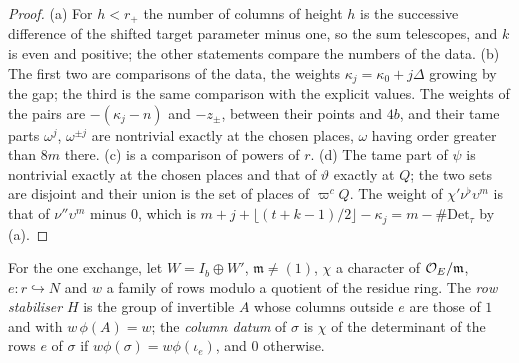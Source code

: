 \begin{proof}
(a) For $h<r_+$ the number of columns of height $h$ is the successive difference of the shifted target parameter minus one, so the sum telescopes, and $k$ is even and positive; the other statements compare the numbers of
the data. (b) The first two are comparisons of the data, the weights $\kappa_j=\kappa_0+j\Delta$ growing by the gap; the third is the same comparison with the explicit values. The weights of the pairs are $-(\kappa_j-n)$ and $-z_\pm$,
between their points and $4b$, and their tame parts $\omega^j$, $\omega^{\pm j}$ are nontrivial exactly at the chosen places, $\omega$ having order greater than $8m$ there. (c) is a comparison of powers of $r$. (d) The tame part of $\psi$ is
nontrivial exactly at the chosen places and that of $\vartheta$ exactly at $Q$; the two sets are disjoint and their union is the set of places of $\varpi^cQ$. The weight of $\chi'\nu^\flat\upsilon^m$ is that of $\nu''\upsilon^m$ minus $0$, which is
$m+j+\lfloor(t+k-1)/2\rfloor-\kappa_j=m-\#\mathrm{Det}_\tau$ by (a).
\end{proof}

For the one exchange, let $W=I_b\oplus W'$, $\mathfrak m\ne(1)$, $\chi$ a character of $\mathcal{O}_E/\mathfrak m$, $e\colon r\hookrightarrow N$ and $w$ a family of rows modulo a quotient of the residue ring. The \emph{row stabiliser} $H$ is the group of invertible $A$
whose columns outside $e$ are those of $1$ and with $w\,\phi(A)=w$; the \emph{column datum} of $\sigma$ is $\chi$ of the determinant of the rows $e$ of $\sigma$ if $w\phi(\sigma)=w\phi(\iota_e)$, and $0$ otherwise.

